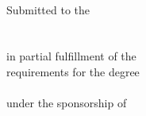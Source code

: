 \begin{titlepage}%
    \begin{center}
        \large  

        \hfill

        \vspace{1.25in}

        \myDisplayTitle \\ \bigskip

        \spacedlowsmallcaps{\myName}

        \vspace{1.75in}

\onehalfspacing
        Submitted to the \\
        \myDivision \\
        \myUni \\
        in partial fulfillment of the \\
        requirements for the degree \\
        \myDegree \\ 
        under the sponsorship of \\
        \myAdvisor \\ \bigskip
\doublespacing

        \myLocation \\
        \myTime


    \end{center}        
\end{titlepage}   